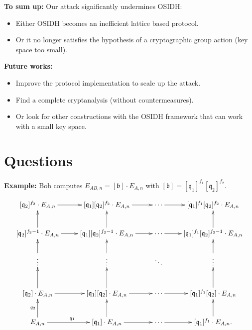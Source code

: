 \documentclass[10pt]{beamer}
\theoremstyle{plain}
\theoremstyle{definition}
\renewcommand{\(}{\left(}
\renewcommand{\)}{\right)}
\newcommand{\mf}[1]{\mathfrak{#1}}
\begin{document}
\begin{frame}
\textbf{To sum up:} Our attack significantly undermines OSIDH:

\vspace{0.3cm}

\begin{itemize}
\item Either OSIDH becomes an inefficient lattice based protocol.

\item Or it no longer satisfies the hypothesis of a cryptographic group action (key space too small).

\end{itemize}

\vspace{0.5cm}
\pause 

\textbf{Future works:}

\vspace{0.3cm}

\begin{itemize}
\item Improve the protocol implementation to scale up the attack.

\item Find a complete cryptanalysis (without countermeasures).

\item Or look for other constructions with the OSIDH framework that can work with a small key space. 
\end{itemize}
\end{frame}

\appendix

\section{Questions}

\begin{frame}
\textbf{Example:} Bob computes $E_{AB,n}=[\mf{b}]\cdot E_{A,n}$ with $[\mf{b}]=[\mf{q}_1]^{f_1}[\mf{q}_2]^{f_2}$.

\[\xymatrix{
[\mf{q}_2]^{f_2}\cdot E_{A,n}  \ar[r] & [\mf{q}_1][\mf{q}_2]^{f_2}\cdot E_{A,n} \ar[r] & \cdots \ar[r] & [\mf{q}_1]^{f_1}[\mf{q}_2]^{f_2}\cdot E_{A,n}\\
[\mf{q}_2]^{f_2-1}\cdot E_{A,n}  \ar[u] \ar[r] & [\mf{q}_1][\mf{q}_2]^{f_2-1}\cdot E_{A,n} \ar[u] \ar[r] & \cdots \ar[r] & [\mf{q}_1]^{f_1}[\mf{q}_2]^{f_2-1}\cdot E_{A,n}\ar[u]\\
\vdots \ar[u] & \vdots \ar[u] & \ddots & \vdots \ar[u]\\
[\mf{q}_2]\cdot E_{A,n}  \ar[u] \ar[r] & [\mf{q}_1][\mf{q}_2]\cdot E_{A,n} \ar[u]\ar[r] & \cdots \ar[r] & [\mf{q}_1]^{f_1}[\mf{q}_2]\cdot E_{A,n} \ar[u] \\
E_{A,n} \ar[u]^{q_2} \ar[r]^{q_1} & [\mf{q}_1]\cdot E_{A,n} \ar[u] \ar[r] & \cdots  \ar[r] & [\mf{q}_1]^{f_1}\cdot E_{A,n}. \ar[u]
}\]

\end{frame}
\end{document}
